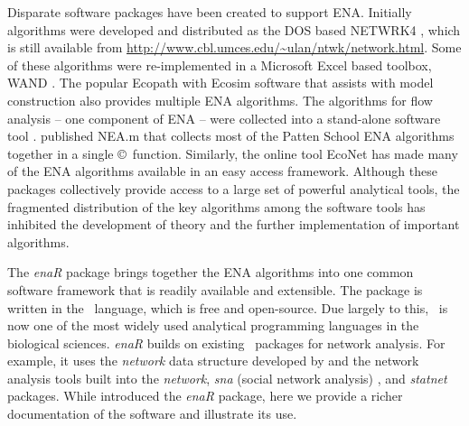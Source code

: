 \documentclass[article]{jss}
\newcommand{\R}{\proglang{R}}
\begin{document}
Disparate software packages have been created to support
ENA. Initially algorithms were developed and distributed as the DOS
based NETWRK4 \citep{ulanowicz91}, which is still available from
\url{http://www.cbl.umces.edu/~ulan/ntwk/network.html}.  Some of these
algorithms were re-implemented in a Microsoft Excel based toolbox,
WAND \citep{allesina04_wand}. The popular Ecopath with Ecosim software
that assists with model construction \citep{christensen04} also
provides multiple ENA algorithms.  The algorithms for flow analysis --
one component of ENA -- were collected into a stand-alone software
tool \citep{latham2006}.  \citet{fath06} published NEA.m that collects
most of the Patten School ENA algorithms together in a single
\copyright\ function. Similarly, the online tool EcoNet
\citep{kazanci07} has made many of the ENA algorithms available
in an easy access framework.  Although these packages collectively
provide access to a large set of powerful analytical tools, the
fragmented distribution of the key algorithms among the software tools
has inhibited the development of theory and the further implementation
of important algorithms.


The \textit{enaR} package brings together the ENA algorithms into one
common software framework that is readily available and extensible.
The package is written in the \R\ language, which is free and
open-source.  Due largely to this, \R\ is now one of the most widely
used analytical programming languages in the biological
sciences. \textit{enaR} builds on existing \R\ packages for network
analysis. For example, it uses the \textit{network} data structure
developed by \citet{butts08_network} and the network analysis tools
built into the \textit{network}, \textit{sna} (social network
analysis) \citep{butts08_social}, and \textit{statnet}
\citep{handcock2008statnet} packages. While
\citet{borrett14_enar} introduced the \textit{enaR} package, here we
provide a richer documentation of the software and illustrate its use.






\end{document}
